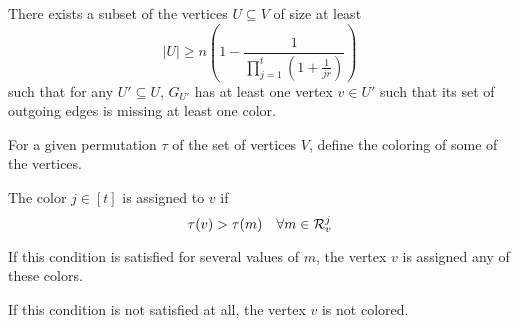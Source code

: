 \begin{frame}
\end{frame}

\begin{frame}
    \begin{lema}
        \label{lemma:rate_lemma}
        There exists a subset of the vertices $U \subseteq V$ of size at least
        $$ \vert U \vert \geq n \left( 1 - \frac{1}{\prod_{j=1}^{t} \left(1 + \frac{1}{jr} \right)} \right) $$
        such that for any $U' \subseteq U$, $G_{U'}$ has at least one vertex $v \in U'$ such that its set of outgoing edges is missing at least one color.
    
    \end{lema}
\end{frame}

\begin{frame}
    For a given permutation $\tau$ of the set of vertices $V$, define the coloring of some of the vertices.
    
    The color $j \in [t]$ is assigned to $v$ if
    $$\tau(v) > \tau(m) \quad \forall m \in \mathcal{R}_v^j$$
    
    If this condition is satisfied for several values of $m$, the vertex $v$ is assigned any of these colors.
    
    If this condition is not satisfied at all, the vertex $v$ is not colored.
\end{frame}

